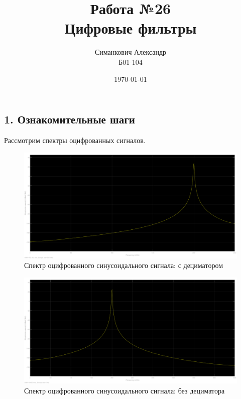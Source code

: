\documentclass[12pt,a4paper]{article}
\title{Работа №26\\ Цифровые фильтры}
\author{Симанкович Александр \\ Б01-104}
\date{\today}
\begin{document}
	\maketitle	
	
	\subsection*{1. Ознакомительные шаги}
	
	Рассмотрим спектры оцифрованных сигналов.
	

	
	\begin{figure}[H]
		\centering
		\includegraphics[width=1.0\linewidth]{res/1_spectrum_wdec.png}
		\caption{Спектр оцифрованного синусоидального сигнала: с дециматором }
	\end{figure}
	
	\begin{figure}[H]
		\centering
		\includegraphics[width=1.0\linewidth]{res/1_spectrum_wodec.png}
		\caption{Спектр оцифрованного синусоидального сигнала: без дециматора }
	\end{figure}
\end{document}
